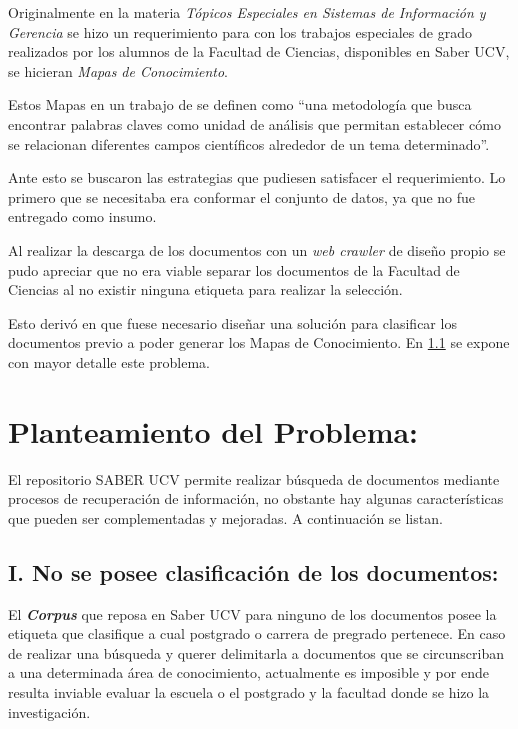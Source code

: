 \documentclass[
  10,
  spanish,
  openany]{book}
\begin{document}
Originalmente en la materia \emph{Tópicos Especiales en Sistemas de Información y Gerencia} se hizo un requerimiento para con los trabajos especiales de grado realizados por los alumnos de la Facultad de Ciencias, disponibles en Saber UCV, se hicieran \emph{Mapas de Conocimiento}.

Estos Mapas en un trabajo de \citep{dueñas2011} se definen como ``una metodología que busca encontrar palabras claves como unidad de análisis que permitan establecer cómo se relacionan diferentes campos científicos alrededor de un tema determinado''.

Ante esto se buscaron las estrategias que pudiesen satisfacer el requerimiento. Lo primero que se necesitaba era conformar el conjunto de datos, ya que no fue entregado como insumo.

Al realizar la descarga de los documentos con un \emph{web crawler} de diseño propio se pudo apreciar que no era viable separar los documentos de la Facultad de Ciencias al no existir ninguna etiqueta para realizar la selección.

Esto derivó en que fuese necesario diseñar una solución para clasificar los documentos previo a poder generar los Mapas de Conocimiento. En \ref{clasificacion} se expone con mayor detalle este problema.

\hypertarget{problema}{%
\section{Planteamiento del Problema:}\label{problema}}

El repositorio SABER UCV permite realizar búsqueda de documentos mediante procesos de recuperación de información, no obstante hay algunas características que pueden ser complementadas y mejoradas. A continuación se listan.

\hypertarget{clasificacion}{%
\subsection{I. No se posee clasificación de los documentos:}\label{clasificacion}}

El \textbf{\emph{Corpus}} que reposa en Saber UCV para ninguno de los documentos posee la etiqueta que clasifique a cual postgrado o carrera de pregrado pertenece. En caso de realizar una búsqueda y querer delimitarla a documentos que se circunscriban a una determinada área de conocimiento, actualmente es imposible y por ende resulta inviable evaluar la escuela o el postgrado y la facultad donde se hizo la investigación.
\end{document}

